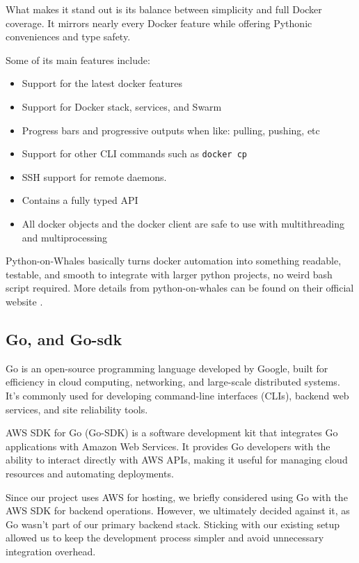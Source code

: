 \documentclass[12pt]{article}
\begin{document}
What makes it stand out is its balance between simplicity and full Docker coverage. 
It mirrors nearly every Docker feature while offering Pythonic conveniences and type safety.

Some of its main features include:
\begin{itemize}
\item Support for the latest docker features
\item Support for Docker stack, services, and Swarm
\item Progress bars and progressive outputs when like: pulling, pushing, etc
\item Support for other CLI commands such as \texttt{docker cp}
\item SSH support for remote daemons.
\item Contains a fully typed API
\item All docker objects and the docker client are safe to use with multithreading and multiprocessing
\end{itemize}

Python-on-Whales basically turns docker automation into something readable, testable, and smooth to
integrate with larger python projects, no weird bash script required.
More details from python-on-whales can be found on their official website \cite{pythononwhales}.

\subsection{Go, and Go-sdk}
Go is an open-source programming language developed by Google, built for efficiency in cloud computing, networking, and large-scale distributed systems.
It’s commonly used for developing command-line interfaces (CLIs), backend web services, and site reliability tools.

AWS SDK for Go (Go-SDK) is a software development kit that integrates Go applications with Amazon Web Services.
It provides Go developers with the ability to interact directly with AWS APIs, making it useful for managing cloud resources and automating deployments.

Since our project uses AWS for hosting, we briefly considered using Go with the AWS SDK for backend operations.
However, we ultimately decided against it, as Go wasn’t part of our primary backend stack.
Sticking with our existing setup allowed us to keep the development process simpler and avoid unnecessary integration overhead.
\end{document}
